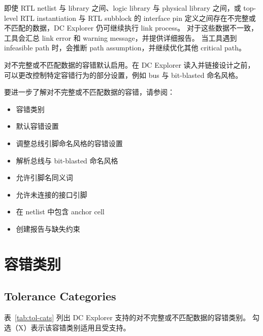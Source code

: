 \label{chap:tolerance}

即使 RTL netlist 与 library 之间、logic library 与 physical library 之间，或 top-level RTL instantiation 与 RTL subblock 的 interface pin 定义之间存在不完整或不匹配的数据，DC Explorer 仍可继续执行 link process。
对于这些数据不一致，工具会汇总 link error 和 warning message，并提供详细报告。
当工具遇到 infeasible path 时，会推断 path assumption，并继续优化其他 critical path。

对不完整或不匹配数据的容错默认启用。在 DC Explorer 读入并链接设计之前，可以更改控制特定容错行为的部分设置，例如 bus 与 bit-blasted 命名风格。

要进一步了解对不完整或不匹配数据的容错，请参阅：
\begin{itemize}
  \item 容错类别
  \item 默认容错设置
  \item 调整总线引脚命名风格的容错设置
  \item 解析总线与 bit-blasted 命名风格
  \item 允许引脚名同义词
  \item 允许未连接的接口引脚
  \item 在 netlist 中包含 anchor cell
  \item 创建报告与缺失约束
\end{itemize}

\section{容错类别}
\subsection*{Tolerance Categories}

表~\ref{tab:tol-cats} 列出 DC Explorer 支持的对不完整或不匹配数据的容错类别。
勾选（X）表示该容错类别适用且受支持。

